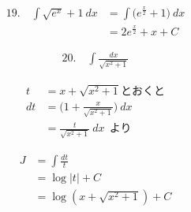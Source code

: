 \documentclass[autodetect-engine,ja=standard, 10.5pt, a4paper, titlepage]{bxjsarticle}
\numberwithin{equation}{section} %
\begin{document}
  \begin{fleqn}[0pt]
    \begin{align*}
      19.\quad \int \sqrt{e^x} + 1 \:dx
      &= \int \biggl( e^{\frac{x}{2}} + 1 \biggr) \:dx \\
      &= 2e^{\frac{x}{2}} + x + C
    \end{align*}
  \end{fleqn}

  \begin{fleqn}[0pt]
    \begin{align*}
      20.\quad \int \frac{dx}{\sqrt{x^2 + 1}}
    \end{align*}
  \end{fleqn}
  \begin{fleqn}[25pt]
    \begin{align*}
      t&=x + \sqrt{x^2 + 1}\text{とおくと}\\
      dt
      &= \biggl(1 + \frac{x}{\sqrt{x^2 + 1}}\biggr)\:dx\\
      &= \frac{t}{\sqrt{x^2 + 1}}\:dx\:\:\text{より}
    \end{align*}
  \end{fleqn}
  \begin{fleqn}[25pt]
    \begin{align*}
      J 
      &= \int \frac{dt}{t} \\
      &= \log|t| + C \\
      &= \log(x + \sqrt{x^2 + 1}) + C
    \end{align*}
  \end{fleqn}
  
\end{document}
